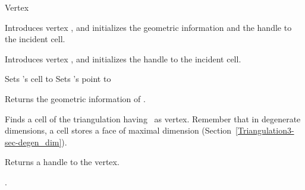 \begin{ccRefClass}{Vertex}
\begin{ccAdvanced}
{Introduces vertex \ccVar, and initializes the geometric information and 
the handle to the incident cell.}

{Introduces vertex \ccVar, and initializes the handle to the incident cell.}


\ccOperations

{Sets \ccVar's cell to }
{Sets \ccVar's point to }

\end{ccAdvanced}

\ccAccessFunctions

{Returns the geometric information of \ccVar.}

{Finds a cell of the triangulation having \ccVar\ as
vertex. Remember that in degenerate dimensions, a cell stores a face
of maximal dimension (Section~\ref{Triangulation3-sec-degen_dim}).}

{Returns a handle to the vertex.}



\ccSeeAlso

.

\end{ccRefClass}


